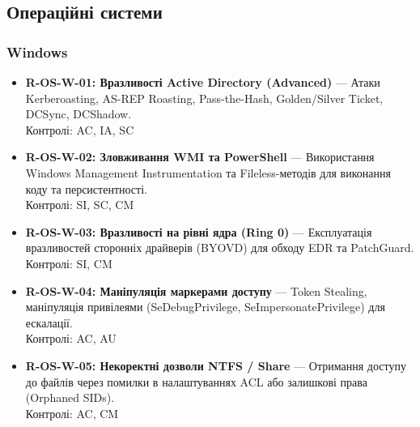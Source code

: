 \documentclass{article}
\begin{document}
\subsection{Операційні системи}
\subsubsection{Windows}
\begin{itemize}
\item \textbf{R-OS-W-01: Вразливості Active Directory (Advanced)} — Атаки Kerberoasting, AS-REP Roasting, Pass-the-Hash, Golden/Silver Ticket, DCSync, DCShadow.
\\ Контролі: AC, IA, SC
\item \textbf{R-OS-W-02: Зловживання WMI та PowerShell} — Використання Windows Management Instrumentation та Fileless-методів для виконання коду та персистентності.
\\ Контролі: SI, SC, CM
\item \textbf{R-OS-W-03: Вразливості на рівні ядра (Ring 0)} — Експлуатація вразливостей сторонніх драйверів (BYOVD) для обходу EDR та PatchGuard.
\\ Контролі: SI, CM
\item \textbf{R-OS-W-04: Маніпуляція маркерами доступу} — Token Stealing, маніпуляція привілеями (SeDebugPrivilege, SeImpersonatePrivilege) для ескалації.
\\ Контролі: AC, AU
\item \textbf{R-OS-W-05: Некоректні дозволи NTFS / Share} — Отримання доступу до файлів через помилки в налаштуваннях ACL або залишкові права (Orphaned SIDs).
\\ Контролі: AC, CM\end{itemize}
\end{document}
